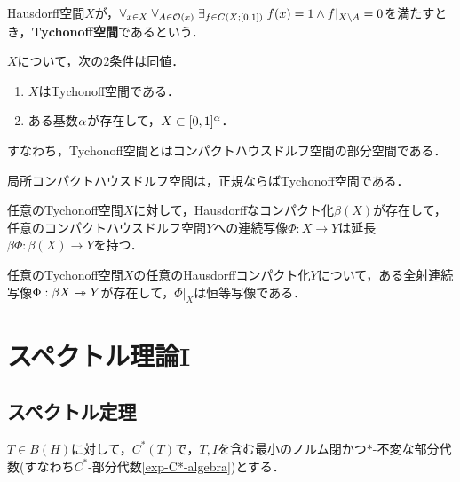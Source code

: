 \documentclass[uplatex,dvipdfmx]{jsreport}
\begin{document}
\begin{definition}
    Hausdorff空間$X$が，$\forall_{x\in X}\;\forall_{A\in\mathcal{O}(x)}\;\exists_{f\in C(X;[0,1])}\;f(x)=1\land f|_{X\setminus A}=0$を満たすとき，\textbf{Tychonoff空間}であるという．
\end{definition}

\begin{proposition}[Tychonoff空間の特徴付け]
    $X$について，次の2条件は同値．
    \begin{enumerate}
        \item $X$はTychonoff空間である．
        \item ある基数$\alpha$が存在して，$X\subset[0,1]^\alpha$．
    \end{enumerate}
    すなわち，Tychonoff空間とはコンパクトハウスドルフ空間の部分空間である．
\end{proposition}

\begin{proposition}[Tychonoff空間の十分条件]
    局所コンパクトハウスドルフ空間は，正規ならばTychonoff空間である．
\end{proposition}

\begin{proposition}
    任意のTychonoff空間$X$に対して，Hausdorffなコンパクト化$\beta(X)$が存在して，任意のコンパクトハウスドルフ空間$Y$への連続写像$\Phi:X\to Y$は延長$\beta\Phi:\beta(X)\to Y$を持つ．
\end{proposition}

\begin{corollary}
    任意のTychonoff空間$X$の任意のHausdorffコンパクト化$Y$について，ある全射連続写像$\Phi:\beta X\twoheadrightarrow Y$が存在して，$\Phi|_X$は恒等写像である．
\end{corollary}

\section{スペクトル理論I}

\subsection{スペクトル定理}

\begin{notation}
    $T\in B(H)$に対して，$C^*(T)$で，$T,I$を含む最小のノルム閉かつ$*$-不変な部分代数(すなわち$C^*$-部分代数\ref{exp-C*-algebra})とする．
\end{notation}
\end{document}
